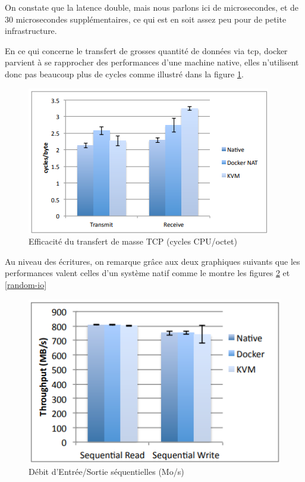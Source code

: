 \documentclass[
    iai, %
    il, %
]{heig-tb}
\begin{document}
On constate que la latence double, mais nous parlons ici de microsecondes, et de 30 microsecondes supplémentaires, ce qui est en soit assez peu pour de petite infrastructure.

En ce qui concerne le transfert de grosses quantité de données via \gls{tcp}, docker parvient à se
rapprocher des performances d'une machine native, elles n'utilisent donc pas beaucoup plus de cycles
comme illustré dans la figure \ref{tcp-transfer-latency}.

\begin{center}
    \begin{figure}
        \includegraphics[width=\textwidth]{./assets/figures/docker-perf-transfer-efficiancy.png}
        \caption[Docker efficacité du transfert de masse]{Efficacité du transfert de masse TCP (cycles CPU/octet) \cite{rad2017introduction} \label{tcp-transfer-latency}}
    \end{figure}
\end{center}

Au niveau des écritures, on remarque grâce aux deux graphiques suivants que les performances valent
celles d'un système natif comme le montre les figures \ref{sequential-io} et \ref{random-io}

\begin{center}
    \begin{figure}
        \includegraphics[width=\textwidth]{./assets/figures/docker-perf-sequential-io.png}
        \caption[Docker débit d'I/O séquentielles]{Débit d'Entrée/Sortie séquentielles (Mo/s) \cite{rad2017introduction} \label{sequential-io}}
    \end{figure}
\end{center}
\end{document}
